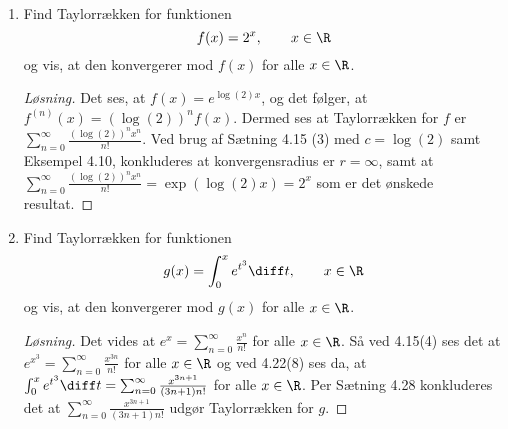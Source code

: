 \begin{opg}\hfill \\
		\begin{enumerate}
			\item Find Taylorrækken for funktionen $$ f(x)=2^x,\qquad   x\in\R $$ 
			og vis, at den konvergerer mod $ f(x) $ for alle $ x\in \R $.
			\ifanswers
			\begin{proof}[Løsning]
				Det ses, at $ f(x)=e^{\log(2)x} $, og det følger, at $ f^{(n)}(x)=\left(\log(2)\right)^nf(x) $. Dermed ses at Taylorrækken for $ f $ er $ \sum_{n=0}^{\infty}\frac{\left(\log(2)\right)^nx^n}{n!} $. Ved brug af Sætning 4.15 (3) med $ c=\log(2) $ samt Eksempel 4.10, konkluderes at konvergensradius er $ r=\infty $, samt at $ \sum_{n=0}^{\infty}\frac{\left(\log(2)\right)^nx^n}{n!}=\exp(\log(2)x)=2^x $ som er det ønskede resultat.
				
				
			\end{proof}
			\fi
				\item Find Taylorrækken for funktionen $$ g(x)=\int_{0}^{x}e^{t^3}\diff t,\qquad   x\in\R $$ 
				og vis, at den konvergerer mod $ g(x) $ for alle $ x\in \R $.
				\ifanswers
				\begin{proof}[Løsning]
				Det vides at $ e^x=\sum_{n=0}^{\infty}\frac{x^n}{n!} $ for alle $ x\in\R $. Så ved 4.15(4) ses det at $ e^{x^3}=\sum_{n=0}^{\infty}\frac{x^{3n}}{n!} $ for alle $ x\in\R $ og ved 4.22(8) ses da, at $ \int_{0}^{x}e^{t^3}\diff t=\sum_{n=0}^{\infty}\frac{x^{3n+1}}{(3n+1)n!} $ for alle $ x\in\R $. Per Sætning 4.28 konkluderes det at $ \sum_{n=0}^{\infty}\frac{x^{3n+1}}{(3n+1)n!} $ udgør Taylorrækken for $ g $.
				\end{proof}
				\fi
		\end{enumerate}
	\end{opg}


